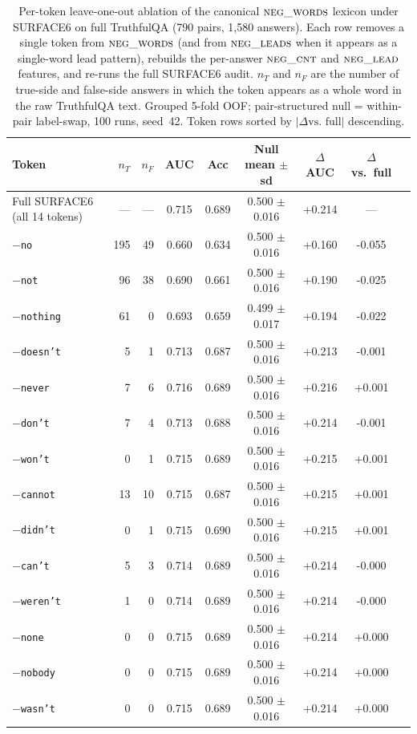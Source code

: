 \begin{table}[t]
\centering
\small
\caption{Per-token leave-one-out ablation of the canonical $\textsc{neg\_words}$ lexicon under SURFACE6 on full TruthfulQA (790 pairs, 1{,}580 answers). Each row removes a single token from $\textsc{neg\_words}$ (and from $\textsc{neg\_leads}$ when it appears as a single-word lead pattern), rebuilds the per-answer $\textsc{neg\_cnt}$ and $\textsc{neg\_lead}$ features, and re-runs the full SURFACE6 audit. $n_T$ and $n_F$ are the number of true-side and false-side answers in which the token appears as a whole word in the raw TruthfulQA text. Grouped 5-fold OOF; pair-structured null = within-pair label-swap, 100 runs, seed~42. Token rows sorted by $|\Delta\text{vs.\ full}|$ descending.}
\label{tab:surface6_per_token_negcnt}
\begin{tabular}{lrrcccccc}
\toprule
Token & $n_T$ & $n_F$ & AUC & Acc & Null mean $\pm$ sd & $\Delta$AUC & $\Delta$ vs.\ full \\
\midrule
Full SURFACE6 (all 14 tokens) & --- & --- & 0.715 & 0.689 & 0.500 $\pm$ 0.016 & +0.214 & --- \\
$-$\texttt{no} & 195 & 49 & 0.660 & 0.634 & 0.500 $\pm$ 0.016 & +0.160 & -0.055 \\
$-$\texttt{not} & 96 & 38 & 0.690 & 0.661 & 0.500 $\pm$ 0.016 & +0.190 & -0.025 \\
$-$\texttt{nothing} & 61 & 0 & 0.693 & 0.659 & 0.499 $\pm$ 0.017 & +0.194 & -0.022 \\
$-$\texttt{doesn't} & 5 & 1 & 0.713 & 0.687 & 0.500 $\pm$ 0.016 & +0.213 & -0.001 \\
$-$\texttt{never} & 7 & 6 & 0.716 & 0.689 & 0.500 $\pm$ 0.016 & +0.216 & +0.001 \\
$-$\texttt{don't} & 7 & 4 & 0.713 & 0.688 & 0.500 $\pm$ 0.016 & +0.214 & -0.001 \\
$-$\texttt{won't} & 0 & 1 & 0.715 & 0.689 & 0.500 $\pm$ 0.016 & +0.215 & +0.001 \\
$-$\texttt{cannot} & 13 & 10 & 0.715 & 0.687 & 0.500 $\pm$ 0.016 & +0.215 & +0.001 \\
$-$\texttt{didn't} & 0 & 1 & 0.715 & 0.690 & 0.500 $\pm$ 0.016 & +0.215 & +0.001 \\
$-$\texttt{can't} & 5 & 3 & 0.714 & 0.689 & 0.500 $\pm$ 0.016 & +0.214 & -0.000 \\
$-$\texttt{weren't} & 1 & 0 & 0.714 & 0.689 & 0.500 $\pm$ 0.016 & +0.214 & -0.000 \\
$-$\texttt{none} & 0 & 0 & 0.715 & 0.689 & 0.500 $\pm$ 0.016 & +0.214 & +0.000 \\
$-$\texttt{nobody} & 0 & 0 & 0.715 & 0.689 & 0.500 $\pm$ 0.016 & +0.214 & +0.000 \\
$-$\texttt{wasn't} & 0 & 0 & 0.715 & 0.689 & 0.500 $\pm$ 0.016 & +0.214 & +0.000 \\
\bottomrule
\end{tabular}
\end{table}
